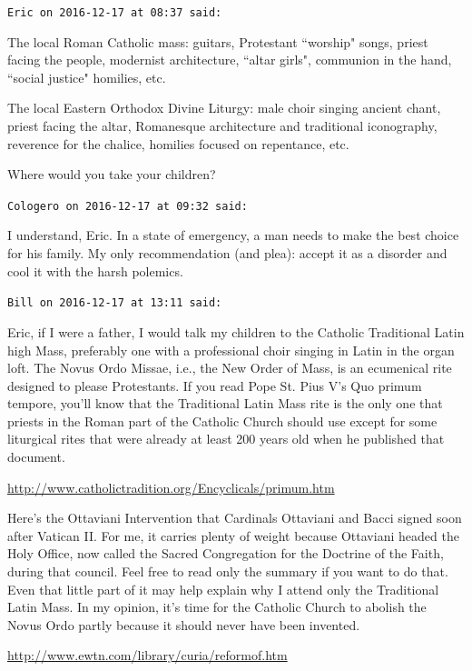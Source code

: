 \begin{footnotesize}
\begin{sffamily}
\hfill

\texttt{Eric on 2016-12-17 at 08:37 said: }

The local Roman Catholic mass: guitars, Protestant ``worship" songs, priest facing the people, modernist architecture, ``altar girls", communion in the hand, ``social justice" homilies, etc.

The local Eastern Orthodox Divine Liturgy: male choir singing ancient chant, priest facing the altar, Romanesque architecture and traditional iconography, reverence for the chalice, homilies focused on repentance, etc.

Where would you take your children?


\hfill

\texttt{Cologero on 2016-12-17 at 09:32 said: }

I understand, Eric. In a state of emergency, a man needs to make the best choice for his family. My only recommendation (and plea): accept it as a disorder and cool it with the harsh polemics.


\hfill

\texttt{Bill on 2016-12-17 at 13:11 said: }

Eric, if I were a father, I would talk my children to the Catholic Traditional Latin high Mass, preferably one with a professional choir singing in Latin in the organ loft. The Novus Ordo Missae, i.e., the New Order of Mass, is an ecumenical rite designed to please Protestants. If you read Pope St. Pius V's Quo primum tempore, you'll know that the Traditional Latin Mass rite is the only one that priests in the Roman part of the Catholic Church should use except for some liturgical rites that were already at least 200 years old when he published that document.

\url{http://www.catholictradition.org/Encyclicals/primum.htm}

Here's the Ottaviani Intervention that Cardinals Ottaviani and Bacci signed soon after Vatican II. For me, it carries plenty of weight because Ottaviani headed the Holy Office, now called the Sacred Congregation for the Doctrine of the Faith, during that council. Feel free to read only the summary if you want to do that. Even that little part of it may help explain why I attend only the Traditional Latin Mass. In my opinion, it's time for the Catholic Church to abolish the Novus Ordo partly because it should never have been invented.

\url{http://www.ewtn.com/library/curia/reformof.htm}


\hfill


\end{sffamily}
\end{footnotesize}
